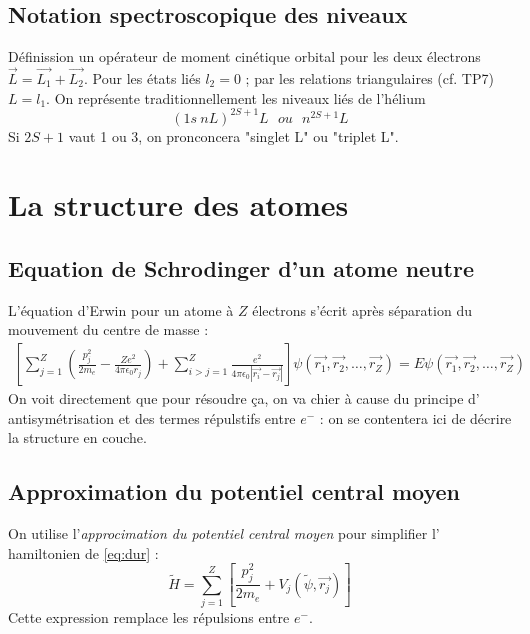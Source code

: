 \documentclass	[11pt, a4paper, openany]{book}
\begin{document}
	\subsection{Notation spectroscopique des niveaux}
	Définission un opérateur de moment cinétique orbital pour les deux électrons $\vec{L}
	=\vec{L_1}+\vec{L_2}$. Pour les états liés $l_2=0$ ; par les relations triangulaires 
	(cf. TP7) $L=l_1$. On représente traditionnellement les niveaux liés de l'hélium
	\begin{equation}
	(1s\ nL)^{2S+1}L\ \ \ ou\ \ \ n^{2S+1}L
	\end{equation}
	Si $2S+1$ vaut 1 ou 3, on pronconcera "singlet L" ou "triplet L".
	
	
\section{La structure des atomes}
	\subsection{Equation de Schrodinger d'un atome neutre}
	L'équation d'Erwin pour un atome à $Z$ électrons s'écrit après séparation du 
	mouvement du centre de masse :
	\begin{multline}
	\left[\sum_{j=1}^Z \left(\frac{p_j^2}{2m_e}-\frac{Ze^2}{4\pi\epsilon_0r_j}\right) + 
	\sum_{i>j=1}^Z \frac{e^2}{4\pi\epsilon_0|\vec{r_i}-\vec{r_j}|}\right]\psi(\vec{r_1},
	\vec{r_2},\dots,\vec{r_Z})
	= E\psi(\vec{r_1},\vec{r_2},\dots,\vec{r_Z})
	\label{eq:dur}
	\end{multline}
	On voit directement que pour résoudre ça, on va chier à cause du principe d'
	antisymétrisation et des termes répulstifs entre $e^-$ : on se contentera ici de
	décrire la structure en couche.
	
	\subsection{Approximation du potentiel central moyen}
	On utilise l'\textit{approcimation du potentiel central moyen} pour simplifier l'
	hamiltonien de \autoref{eq:dur} :
	\begin{equation}
	\tilde{H} = \sum_{j=1}^Z \left[\frac{p_j^2}{2m_e}+V_j(\tilde{\psi},\vec{r_j})\right]
	\label{eq:ApproxCentralMoyen}
	\end{equation}
	Cette expression remplace les répulsions entre $e^-$.
	
\end{document}
